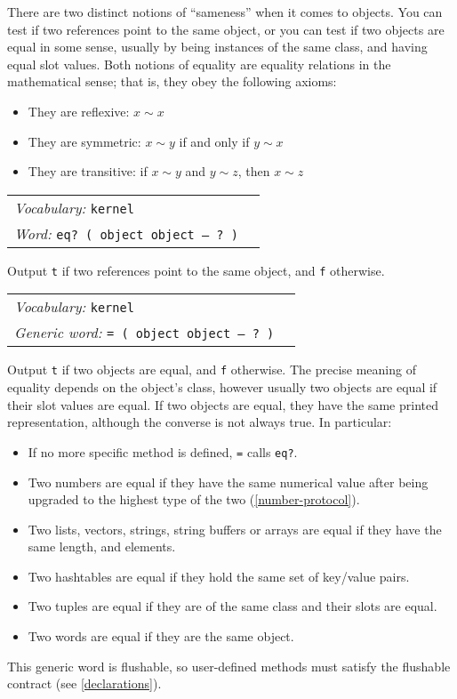 \documentclass{book}
\newcommand{\vocabulary}[1]{\emph{Vocabulary:} \texttt{#1}&\\}
\newcommand{\ordinaryword}[2]{\index{\texttt{#1}}\emph{Word:} \texttt{#2}&\\}
\newcommand{\genericword}[2]{\index{\texttt{#1}}\emph{Generic word:} \texttt{#2}&\\}
\newcommand{\wordtable}[1]{


\begin{tabularx}{12cm}{lX}
\hline
#1
\hline
\end{tabularx}

}
\begin{document}
There are two distinct notions of ``sameness'' when it comes to objects. You can test if two references point to the same object, or you can test if two objects are equal in some sense, usually by being instances of the same class, and having equal slot values. Both notions of equality are equality relations in the mathematical sense; that is, they obey the following axioms:
\begin{itemize}
\item They are reflexive: $x\sim x$
\item They are symmetric: $x\sim y$ if and only if $y\sim x$
\item They are transitive: if $x\sim y$ and $y\sim z$, then $x\sim z$
\end{itemize}

\wordtable{
\vocabulary{kernel}
\ordinaryword{eq?}{eq?~( object object -- ?~)}
}
Output \texttt{t} if two references point to the same object, and \texttt{f} otherwise.
\wordtable{
\vocabulary{kernel}
\genericword{=}{= ( object object -- ?~)}
}
Output \texttt{t} if two objects are equal, and \texttt{f} otherwise. The precise meaning of equality depends on the object's class, however usually two objects are equal if their slot values are equal. If two objects are equal, they have the same printed representation, although the converse is not always true. In particular:
\begin{itemize}
\item If no more specific method is defined, \texttt{=} calls \texttt{eq?}.
\item Two numbers are equal if they have the same numerical value after being upgraded to the highest type of the two (\ref{number-protocol}).
\item Two lists, vectors, strings, string buffers or arrays are equal if they have the same length, and elements.
\item Two hashtables are equal if they hold the same set of key/value pairs.
\item Two tuples are equal if they are of the same class and their slots are equal.
\item Two words are equal if they are the same object.
\end{itemize}
This generic word is flushable, so user-defined methods must satisfy the flushable contract (see \ref{declarations}).
\end{document}

